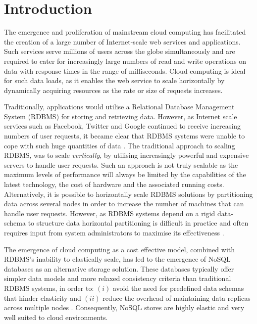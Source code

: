 \chapter{Introduction}
    \graphicspath{{Chapter1-Introduction/Figs/Vector/}{Chapter1-Introduction/Figs/}}
    
    The emergence and proliferation of mainstream cloud computing has facilitated the creation of a large number of Internet-scale web services and applications.  Such services serve millions of users across the globe simultaneously and are required to cater for increasingly large numbers of read and write operations on data with response times in the range of milliseconds. Cloud computing is ideal for such data loads, as it enables the web service to scale horizontally by dynamically acquiring resources as the rate or size of requests increases.  
    
    Traditionally, applications would utilise a Relational Database Management System (RDBMS) for storing and retrieving data.  However, as Internet scale services such as Facebook, Twitter and Google continued to receive increasing numbers of user requests, it became clear that RDBMS systems were unable to cope with such huge quantities of data \citep{DBLP:journals/corr/MoniruzzamanH13}.  The traditional approach to scaling RDBMS, was to scale \emph{vertically}, by utilising increasingly powerful and expensive servers to handle user requests.  Such an approach is not truly scalable as the maximum levels of performance will always be limited by the capabilities of the latest technology, the cost of hardware and the associated running costs.  Alternatively, it is possible to horizontally scale RDBMS solutions by partitioning data across several nodes in order to increase the number of machines that can handle user requests.  However, as RDBMS systems depend on a rigid data-schema to structure data horizontal partitioning is difficult in practice and often requires input from system administrators to maximise its effectiveness \citep{Han:6106531}.          
    
    The emergence of cloud computing as a cost effective model, combined with RDBMS's inability to elastically scale, has led to the emergence of NoSQL databases as an alternative storage solution.  These databases typically offer simpler data models and more relaxed consistency criteria than traditional RDBMS systems, in order to: $(i)$ avoid the need for predefined data schemas that hinder elasticity and $(ii)$ reduce the overhead of maintaining data replicas across multiple nodes \citep{Cattell:2011:SSN:1978915.1978919}.  Consequently, NoSQL stores are highly elastic and very well suited to cloud environments.  
    
